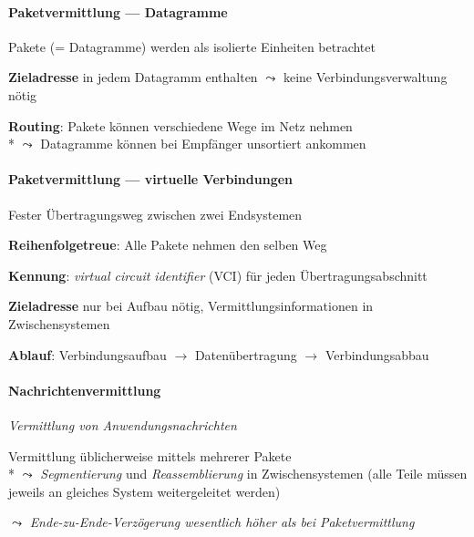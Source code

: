 \paragraph{Paketvermittlung --- Datagramme}
\begin{items}
  \item Pakete (= Datagramme) werden als isolierte Einheiten betrachtet
  \item \textbf{Zieladresse} in jedem Datagramm enthalten \( \leadsto \) keine Verbindungsverwaltung nötig
  \item \textbf{Routing}: Pakete können verschiedene Wege im Netz nehmen \\*
    \( \leadsto \) Datagramme können bei Empfänger unsortiert ankommen
\end{items}

\paragraph{Paketvermittlung --- virtuelle Verbindungen}
\begin{items}
  \item Fester Übertragungsweg zwischen zwei Endsystemen
  \item \textbf{Reihenfolgetreue}: Alle Pakete nehmen den selben Weg
  \item \textbf{Kennung}: \emph{virtual circuit identifier} (VCI) für jeden Übertragungsabschnitt
  \item \textbf{Zieladresse} nur bei Aufbau nötig, Vermittlungsinformationen in Zwischensystemen
  \item \textbf{Ablauf}: Verbindungsaufbau \( \to \) Datenübertragung \( \to \) Verbindungsabbau
\end{items}

\paragraph{Nachrichtenvermittlung}
\begin{items}
  \item \emph{Vermittlung von Anwendungsnachrichten}
  \item Vermittlung üblicherweise mittels mehrerer Pakete \\*
    \( \leadsto \) \emph{Segmentierung} und \emph{Reassemblierung} in Zwischensystemen (alle Teile müssen jeweils an gleiches System weitergeleitet werden)
  \item \( \leadsto \) \emph{Ende-zu-Ende-Verzögerung wesentlich höher als bei Paketvermittlung}
\end{items}

